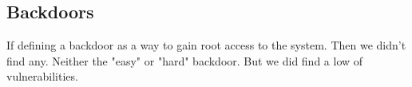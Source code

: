 \subsection{Backdoors}

If defining a backdoor as a way to gain root access to the system. Then we didn't find any. Neither the "easy" or "hard" backdoor. But we did find a low of vulnerabilities. \\

